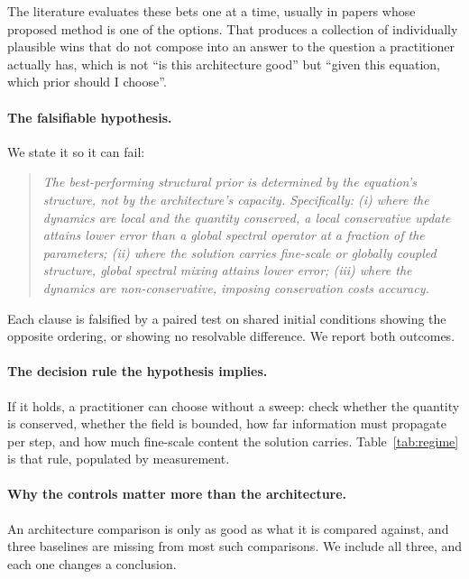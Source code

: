\documentclass{article}
\begin{document}
The literature evaluates these bets one at a time, usually in papers whose proposed
method is one of the options. That produces a collection of individually plausible wins
that do not compose into an answer to the question a practitioner actually has, which is
not ``is this architecture good'' but ``given this equation, which prior should I
choose''.

\paragraph{The falsifiable hypothesis.} We state it so it can fail:

\begin{quote}
\textit{The best-performing structural prior is determined by the equation's structure,
not by the architecture's capacity. Specifically: (i) where the dynamics are local and
the quantity conserved, a local conservative update attains lower error than a global
spectral operator at a fraction of the parameters; (ii) where the solution carries
fine-scale or globally coupled structure, global spectral mixing attains lower error;
(iii) where the dynamics are non-conservative, imposing conservation costs accuracy.}
\end{quote}

Each clause is falsified by a paired test on shared initial conditions showing the
opposite ordering, or showing no resolvable difference. We report both outcomes.

\paragraph{The decision rule the hypothesis implies.} If it holds, a practitioner can
choose without a sweep: check whether the quantity is conserved, whether the field is
bounded, how far information must propagate per step, and how much fine-scale content
the solution carries. Table~\ref{tab:regime} is that rule, populated by measurement.

\paragraph{Why the controls matter more than the architecture.} An architecture
comparison is only as good as what it is compared against, and three baselines are
missing from most such comparisons. We include all three, and each one changes a
conclusion.
\end{document}
